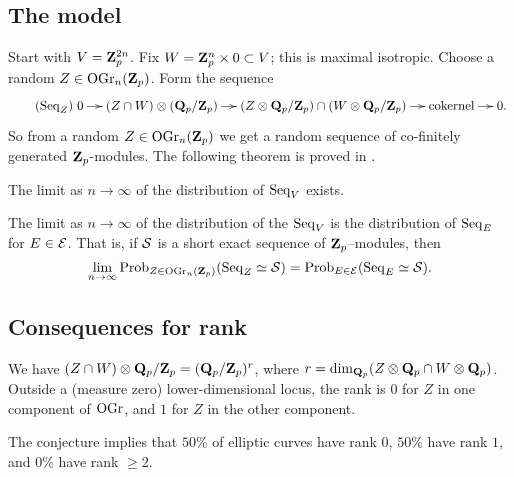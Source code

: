 \subsection{The model}

Start with $V=\mathbf{Z}_p^{2 n}$. Fix $W=\mathbf{Z}_p^n\times 0\subset V$; this is maximal 
isotropic. Choose a random $Z\in \operatorname{OGr}_n(\mathbf{Z}_p)$. Form the 
sequence 
\begin{equation*}\tag{$\sequence_Z$}\label{eq:seq-Z}
\xymatrix@=0.4cm{
  0 \ar[r] 
    & (Z\cap W)\otimes (\dQ_p/\dZ_p) \ar[r] 
    & (Z\otimes \dQ_p/\dZ_p)\cap (W\otimes \dQ_p/\dZ_p) \ar[r] 
    & \textnormal{cokernel} \ar[r] 
    & 0 .
}
\end{equation*}
So from a random $Z\in \operatorname{OGr}_n(\mathbf{Z}_p)$ we get a random 
sequence of co-finitely generated $\mathbf{Z}_p$-modules. The following theorem is 
proved in \cite{bklpr13}. 

\begin{theo}
The limit as $n\to \infty$ of the distribution of $\operatorname{Seq}_V$ exists.
\end{theo}

\begin{conjecture}
The limit as $n\to \infty$ of the distribution of the $\operatorname{Seq}_V$ is the 
distribution of $\operatorname{Seq}_E$ for $E\in \mathcal{E}$. That is, if $\mathcal{S}$ is a short 
exact sequence of $\mathbf{Z}_p$--modules, then 
\[
  \lim_{n\to \infty}\operatorname{Prob}_{Z\in \operatorname{OGr}_n(\mathbf{Z}_p)}(\operatorname{Seq}_Z\simeq \mathcal{S}) = \operatorname{Prob}_{E\in \mathcal{E}}(\operatorname{Seq}_E\simeq \mathcal{S}) .
\]
\end{conjecture}





\subsection{Consequences for rank}

We have $(Z\cap W)\otimes \mathbf{Q}_p/\mathbf{Z}_p = (\mathbf{Q}_p/\mathbf{Z}_p)^r$, where 
$r=\dim_{\mathbf{Q}_p}(Z\otimes \mathbf{Q}_p \cap W\otimes \mathbf{Q}_p)$. Outside a (measure zero) 
lower-dimensional locus, the rank is $0$ for $Z$ in one component of 
$\operatorname{OGr}$, and $1$ for $Z$ in the other component. 

\begin{coro}
The conjecture implies that $50\%$ of elliptic curves have rank $0$, 
$50\%$ have rank $1$, and $0\%$ have rank $\geqslant 2$. 
\end{coro}





